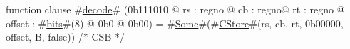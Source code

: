 function clause #\hyperref[zdecode]{decode}# (0b111010 @ rs : regno @ cb : regno@ rt : regno @ offset : #\hyperref[zbits]{bits}#(8) @ 0b0 @ 0b00) = #\hyperref[zSome]{Some}#(#\hyperref[zCStore]{CStore}#(rs, cb, rt, 0b00000, offset, B, false)) /* CSB */
